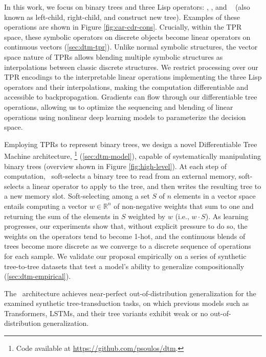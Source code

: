 In this work, we focus on binary trees and three Lisp operators: \car, \cdr, and \cons\ \cite{steele1990common} (also known as left-child, right-child, and construct new tree). Examples of these operations are shown in Figure \ref{fig:car-cdr-cons}. Crucially, within the TPR space, these symbolic operators on discrete objects become linear operators on continuous vectors (\textsection \ref{sec:dtm-tpr}). Unlike normal symbolic structures, the vector space nature of TPRs allows blending multiple symbolic structures as interpolations between classic discrete structures. We restrict processing over our TPR encodings to the interpretable linear operations implementing the three Lisp operators and their interpolations, making the computation differentiable and accessible to backpropagation. Gradients can flow through our differentiable tree operations, allowing us to optimize the sequencing and blending of linear operations using nonlinear deep learning models to parameterize the decision space.

Employing TPRs to represent binary trees, we design a novel Differentiable Tree Machine architecture, \blackboard\footnote{Code available at \url{https://github.com/psoulos/dtm}.} (\textsection \ref{sec:dtm-model}), capable of systematically manipulating binary trees (overview shown in Figure \ref{fig:high-level}). At each step of computation, \blackboard\ soft-selects a binary tree to read from an external memory, soft-selects a linear operator to apply to the tree, and then writes the resulting tree to a new memory slot. Soft-selecting among a set $S$ of $n$ elements in a vector space entails computing a vector $w \in \mathbb{R}^n$ of non-negative weights that sum to one and returning the sum of the elements in $S$ weighted by $w$ (i.e., $w \cdot S$). As learning progresses, our experiments show that, without explicit pressure to do so, the weights on the operators tend to become 1-hot, and the continuous blends of trees become more discrete as we converge to a discrete sequence of operations for each sample. We validate our proposal empirically on a series of synthetic tree-to-tree datasets that test a model's ability to generalize compositionally (\textsection \ref{sec:dtm-empirical}).


The \blackboard\ architecture achieves near-perfect out-of-distribution generalization for the examined synthetic tree-transduction tasks, on which previous models such as Transformers, LSTMs, and their tree variants exhibit weak or no out-of-distribution generalization. 

